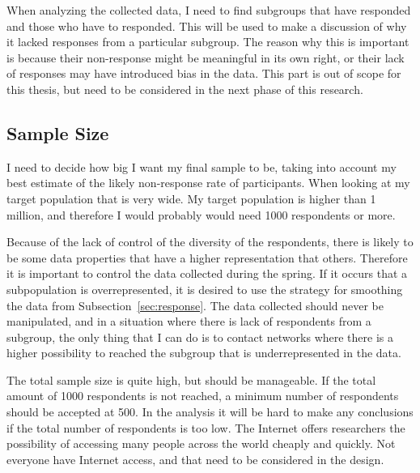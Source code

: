     When analyzing the collected data, I need to find subgroups that have responded and those who have to responded. This will be used to make a discussion of why it lacked responses from a particular subgroup. The reason why this is important is because their non-response might be meaningful in its own right, or their lack of responses may have introduced bias in the data. This part is out of scope for this thesis, but need to be considered in the next phase of this research.
  
  \subsection{Sample Size} \label{sec:samplesize}

    I need to decide how big I want my final sample to be, taking into account my best estimate of the likely non-response rate of participants. When looking at my target population that is very wide. My target population is higher than 1 million, and therefore I would probably would need 1000 respondents or more.

    Because of the lack of control of the diversity of the respondents, there is likely to be some data properties that have a higher representation that others. Therefore it is important to control the data collected during the spring. If it occurs that a subpopulation is overrepresented, it is desired to use the strategy for smoothing the data from Subsection~\ref{sec:response}. The data collected should never be manipulated, and in a situation where there is lack of respondents from a subgroup, the only thing that I can do is to contact networks where there is a higher possibility to reached the subgroup that is underrepresented in the data.

    The total sample size is quite high, but should be manageable. If the total amount of 1000 respondents is not reached, a minimum number of respondents should be accepted at 500. In the analysis it will be hard to make any conclusions if the total number of respondents is too low.  The Internet offers researchers the possibility of accessing many people across the world cheaply and quickly. Not everyone have Internet access, and that need to be considered in the design.
